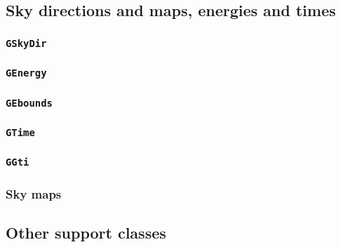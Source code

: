 \documentclass{article}[12pt,a4]
\begin{document}
\subsection{Sky directions and maps, energies and times}

\subsubsection{{\tt GSkyDir}}
\label{sec:GSkyDir}

\subsubsection{{\tt GEnergy}}
\label{sec:GEnergy}

\subsubsection{{\tt GEbounds}}
\label{sec:GEbounds}

\subsubsection{{\tt GTime}}
\label{sec:GTime}

\subsubsection{{\tt GGti}}
\label{sec:GGti}

\subsubsection{Sky maps}
\label{sec:GSkymap}


\subsection{Other support classes}

\end{document}
